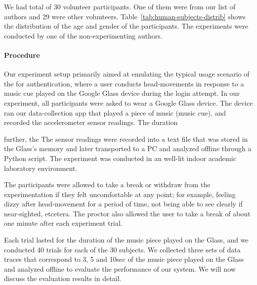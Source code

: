 We had total of 30 volunteer participants. One of them were 
from our list of authors and 29 were other volunteers. 
Table~\ref{tab:human-subjects-distrib} shows the distribution of the age and 
gender of the participants.
The experiments were conducted by one of the non-experimenting authors. 

\paragraph{Procedure}
Our experiment setup primarily aimed at emulating the typical usage scenario 
of the \systemname for authentication, where a user conducts head-movements in 
response to a music cue played on the Google Glass device during the login 
attempt.
In our experiment, all participants were asked to wear a Google Glass 
device. The device ran our data-collection app that played a piece of music 
(music cue), and recorded the accelerometer sensor readings. 
The duration

further, the 
The sensor 
readings were recorded into a text 
file that was stored 
in the Glass's memory and later transported to a PC and analyzed offline 
through a Python script. The experiment was conducted in an well-lit indoor 
academic laboratory environment. 


 
The participants were allowed to take a break or withdraw from the 
experimentation if they felt uncomfortable at any point; for example, feeling 
dizzy after head-movement for a period of time, not being able to see clearly 
if near-sighted, etcetera. The proctor also allowed the user to take a break 
of about one minute after each experiment trial.

Each trial lasted for the duration of the music piece played on the Glass, and 
we conducted 40 trials for each of the 30 subjects. 
We collected three sets of data traces that correspond to 3, 5 and 10sec of 
the music piece played on the Glass and analyzed offline to evaluate the 
performance of our system.
We will now discuss the evaluation results in detail.

